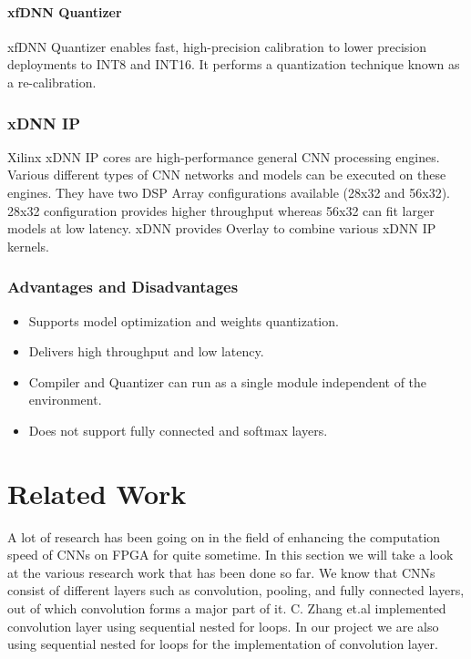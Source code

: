 \documentclass[titlepage]{report}
\begin{document}
\subsubsection{xfDNN Quantizer} 

xfDNN Quantizer enables fast, high-precision calibration to lower precision deployments to INT8 and INT16. It performs a quantization technique known as a re-calibration.

\subsection{xDNN IP}
Xilinx xDNN IP cores are high-performance general CNN processing engines. Various different types of CNN networks and models can be executed on these engines. They have two DSP Array configurations available (28x32 and 56x32). 28x32 configuration provides higher throughput whereas 56x32 can fit larger models at low latency.
xDNN provides Overlay to combine various xDNN IP kernels.

\subsection{Advantages and Disadvantages}
  
 \begin{itemize}
 \item Supports model optimization and weights quantization.
 \item Delivers high throughput and low latency.
 \item Compiler and Quantizer can run as a single module independent of the environment.
 \item Does not support fully connected and softmax layers.
 
 \end{itemize}




\chapter{Related Work}
 A lot of research has been going on in the field of enhancing the computation speed of CNNs on FPGA for quite sometime. In this section we will take a look at the various research work that has been done so far. We know that CNNs consist of different layers such as convolution, pooling, and fully connected layers, out of which convolution forms a major part of it. C. Zhang et.al implemented convolution layer using sequential nested for loops. In our project we are also using sequential nested for loops for the implementation of convolution layer. 
\end{document}
